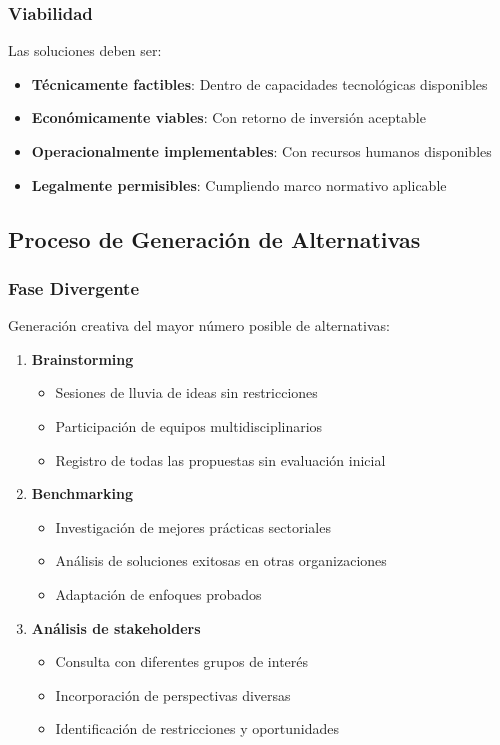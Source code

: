 \documentclass[12pt,letterpaper,oneside]{book}
\begin{document}
\subsubsection{Viabilidad}

Las soluciones deben ser:
\begin{itemize}
\item \textbf{Técnicamente factibles}: Dentro de capacidades tecnológicas disponibles
\item \textbf{Económicamente viables}: Con retorno de inversión aceptable
\item \textbf{Operacionalmente implementables}: Con recursos humanos disponibles
\item \textbf{Legalmente permisibles}: Cumpliendo marco normativo aplicable
\end{itemize}

\subsection{Proceso de Generación de Alternativas}

\subsubsection{Fase Divergente}

Generación creativa del mayor número posible de alternativas:

\begin{enumerate}
\item \textbf{Brainstorming}
   \begin{itemize}
   \item Sesiones de lluvia de ideas sin restricciones
   \item Participación de equipos multidisciplinarios
   \item Registro de todas las propuestas sin evaluación inicial
   \end{itemize}

\item \textbf{Benchmarking}
   \begin{itemize}
   \item Investigación de mejores prácticas sectoriales
   \item Análisis de soluciones exitosas en otras organizaciones
   \item Adaptación de enfoques probados
   \end{itemize}

\item \textbf{Análisis de stakeholders}
   \begin{itemize}
   \item Consulta con diferentes grupos de interés
   \item Incorporación de perspectivas diversas
   \item Identificación de restricciones y oportunidades
   \end{itemize}
\end{enumerate}
\end{document}
